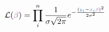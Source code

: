 \documentclass[convert={density=400,outext=.png}]{standalone}
\begin{document}
\pagecolor{almost-white}


$\displaystyle
\mathcal{L}({\color[HTML]{984EA3}\beta})=\prod_i^n\frac{1}{\sigma \sqrt{2\pi}} e^{-\frac{({\color[HTML]{377EB8}y_i} - {\color[HTML]{377EB8}x_i}{\color[HTML]{984EA3}\beta})^2}{2\sigma^2}}
$
\end{document}
